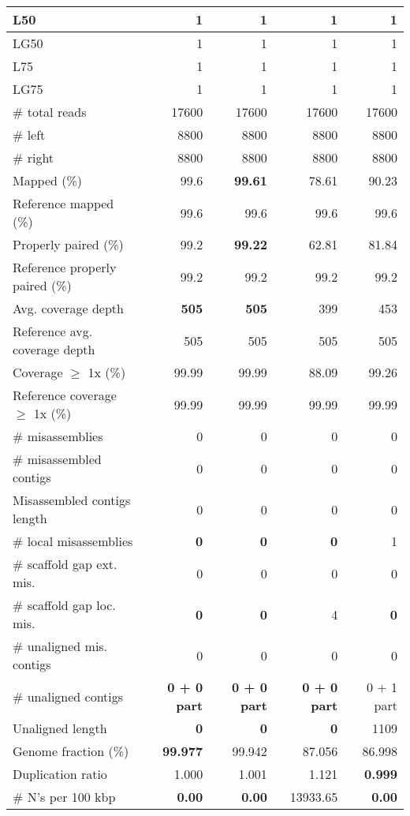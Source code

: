 \documentclass[12pt,a4paper]{article}
\begin{document}
\begin{table}[ht]
\begin{center}
\begin{tabular}{|l*{4}{|r}|}
L50 & 1 & 1 & 1 & 1 \\ \hline
LG50 & 1 & 1 & 1 & 1 \\ \hline
L75 & 1 & 1 & 1 & 1 \\ \hline
LG75 & 1 & 1 & 1 & 1 \\ \hline
\# total reads & 17600 & 17600 & 17600 & 17600 \\ \hline
\# left & 8800 & 8800 & 8800 & 8800 \\ \hline
\# right & 8800 & 8800 & 8800 & 8800 \\ \hline
Mapped (\%) & 99.6 & {\bf 99.61} & 78.61 & 90.23 \\ \hline
Reference mapped (\%) & 99.6 & 99.6 & 99.6 & 99.6 \\ \hline
Properly paired (\%) & 99.2 & {\bf 99.22} & 62.81 & 81.84 \\ \hline
Reference properly paired (\%) & 99.2 & 99.2 & 99.2 & 99.2 \\ \hline
Avg. coverage depth & {\bf 505} & {\bf 505} & 399 & 453 \\ \hline
Reference avg. coverage depth & 505 & 505 & 505 & 505 \\ \hline
Coverage $\geq$ 1x (\%) & 99.99 & 99.99 & 88.09 & 99.26 \\ \hline
Reference coverage $\geq$ 1x (\%) & 99.99 & 99.99 & 99.99 & 99.99 \\ \hline
\# misassemblies & 0 & 0 & 0 & 0 \\ \hline
\# misassembled contigs & 0 & 0 & 0 & 0 \\ \hline
Misassembled contigs length & 0 & 0 & 0 & 0 \\ \hline
\# local misassemblies & {\bf 0} & {\bf 0} & {\bf 0} & 1 \\ \hline
\# scaffold gap ext. mis. & 0 & 0 & 0 & 0 \\ \hline
\# scaffold gap loc. mis. & {\bf 0} & {\bf 0} & 4 & {\bf 0} \\ \hline
\# unaligned mis. contigs & 0 & 0 & 0 & 0 \\ \hline
\# unaligned contigs & {\bf 0 + 0 part} & {\bf 0 + 0 part} & {\bf 0 + 0 part} & 0 + 1 part \\ \hline
Unaligned length & {\bf 0} & {\bf 0} & {\bf 0} & 1109 \\ \hline
Genome fraction (\%) & {\bf 99.977} & 99.942 & 87.056 & 86.998 \\ \hline
Duplication ratio & 1.000 & 1.001 & 1.121 & {\bf 0.999} \\ \hline
\# N's per 100 kbp & {\bf 0.00} & {\bf 0.00} & 13933.65 & {\bf 0.00} \\ \hline

\end{tabular}
\end{center}
\end{table}
\end{document}
